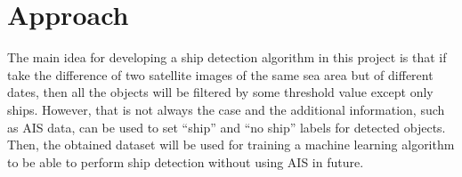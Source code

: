 \section{Approach}

The main idea for developing a ship detection algorithm in this project is that if take the difference of two satellite images of the same sea area but of different dates, then all the objects will be filtered by some threshold value except only ships. However, that is not always the case and the additional information, such as AIS data, can be used to set “ship” and “no ship” labels for detected objects. Then, the obtained dataset will be used for training a machine learning algorithm to be able to perform ship detection without using \gls{AIS} in future.

